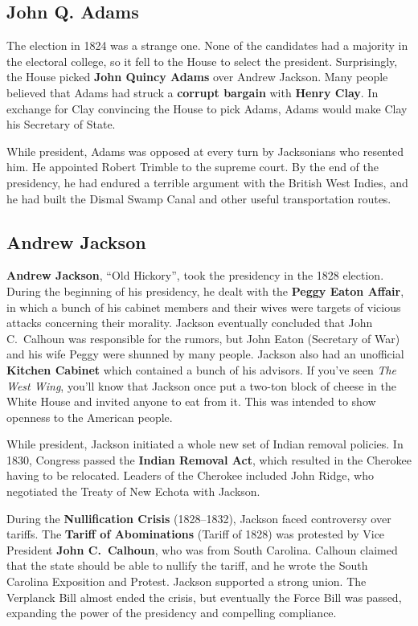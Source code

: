 \subsection*{John Q. Adams}

The election in 1824 was a strange one.
None of the candidates had a majority in the electoral college, so it fell to the House to select the president.
Surprisingly, the House picked \textbf{John Quincy Adams} over Andrew Jackson.
Many people believed that Adams had struck a \textbf{corrupt bargain} with \textbf{Henry Clay}.
In exchange for Clay convincing the House to pick Adams, Adams would make Clay his Secretary of State.

While president, Adams was opposed at every turn by Jacksonians who resented him.
He appointed Robert Trimble to the supreme court.
By the end of the presidency, he had endured a terrible argument with the British West Indies,
and he had built the Dismal Swamp Canal and other useful transportation routes.

\subsection*{Andrew Jackson}

\textbf{Andrew Jackson}, ``Old Hickory'', took the presidency in the 1828 election.
During the beginning of his presidency, he dealt with the \textbf{Peggy Eaton Affair},
in which a bunch of his cabinet members and their wives were targets of vicious attacks concerning their morality.
Jackson eventually concluded that John C.\ Calhoun was responsible for the rumors,
but John Eaton (Secretary of War) and his wife Peggy were shunned by many people.
Jackson also had an unofficial \textbf{Kitchen Cabinet} which contained a bunch of his advisors.
If you've seen \textit{The West Wing},
you'll know that Jackson once put a two-ton block of cheese in the White House and invited anyone to eat from it.
This was intended to show openness to the American people.

While president, Jackson initiated a whole new set of Indian removal policies.
In 1830, Congress passed the \textbf{Indian Removal Act}, which resulted in the Cherokee having to be relocated.
Leaders of the Cherokee included John Ridge, who negotiated the Treaty of New Echota with Jackson.

During the \textbf{Nullification Crisis} (1828--1832), Jackson faced controversy over tariffs.
The \textbf{Tariff of Abominations} (Tariff of 1828) was protested by Vice President \textbf{John C.\ Calhoun},
who was from South Carolina.
Calhoun claimed that the state should be able to nullify the tariff,
and he wrote the South Carolina Exposition and Protest.
Jackson supported a strong union.
The Verplanck Bill almost ended the crisis,
but eventually the Force Bill was passed, expanding the power of the presidency and compelling compliance.

